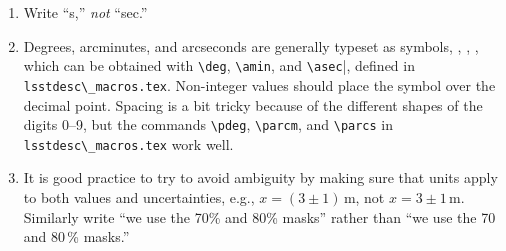 \documentclass[letterpaper,11pt]{article}
\begin{document}
\begin{enumerate}
\item Write ``s,'' {\it not\/} ``sec.''


\item Degrees, arcminutes, and arcseconds are generally typeset as symbols,
\deg, \amin, \asec, which can be obtained with \verb|\deg|, \verb|\amin|, and \verb|\asec||,
defined in \verb|lsstdesc\_macros.tex|.  Non-integer values should place the symbol over the
decimal point.  Spacing is a bit tricky because of the different shapes of the
digits 0--9, but the commands \verb|\pdeg|, \verb|\parcm|, and \verb|\parcs| in \verb| lsstdesc\_macros.tex|
work well.  



\item It is good practice to try to avoid ambiguity by making sure that units
apply to both values and uncertainties, e.g., $x=(3\pm1)\,$m, not $x=3\pm1\,$m.
 Similarly write ``we use the 70\% and 80\% masks'' rather than ``we use
the 70 and 80\,\% masks.''





\end{enumerate}
\end{document}
